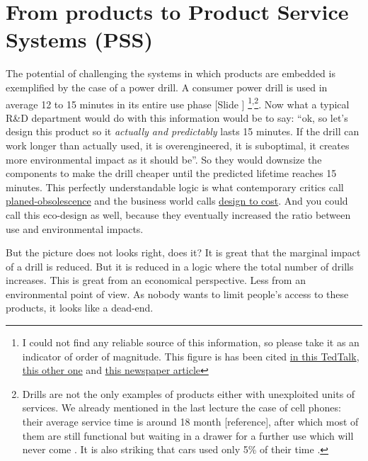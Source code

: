\documentclass{article}
\newcounter{slide}
\begin{document}
\section{From products to Product Service Systems (PSS)}
\label{sec:pss}
The potential of challenging the systems in which products are embedded is exemplified by the case of a power drill. A consumer power drill is used in average 12 to 15 minutes in its entire use phase {\color{blue}[Slide ]}
\footnote{I could not find any reliable source of this information, so please take it as an indicator of order of magnitude. This figure is has been cited \href{https://www.ted.com/talks/rachel_botsman_the_case_for_collaborative_consumption?language=en}{in this TedTalk}, \href{https://tedxinnovations.ted.com/2015/04/16/spotlight-tedx-talk-how-much-do-you-use-that-power-drill-why-were-sharing-tools-with-everyone-in-our-city/}{this other one} and \href{https://www.fastcompany.com/3050775/the-sharing-economy-is-dead-and-we-killed-it}{this newspaper article}}\textsuperscript{,}\footnote{Drills are not the only examples of products either with unexploited units of services. We already mentioned in the last lecture the case of cell phones: their average service time is around 18 month [reference], after which most of them are still functional but waiting in a drawer for a further use which will never come \cite{hanson2014s}. It is also striking that cars used only 5\% of their time \cite{meijkampChangingConsumerBehaviour1999}.}.
Now what a typical R\&D department would do with this information would be to say: ``ok, so let's design this product so it \emph{actually and predictably} lasts 15 minutes. If the drill can work longer than actually used, it is overengineered, it is suboptimal, it creates more environmental impact as it should be''. So they would downsize the components to make the drill cheaper until the predicted lifetime reaches 15 minutes. This perfectly understandable logic is what contemporary critics call \href{https://en.wikipedia.org/wiki/Planned_obsolescence}{planed-obsolescence} and the business world calls \href{https://en.wikipedia.org/wiki/Design-to-cost}{design to cost}. And you could call this eco-design as well, because they eventually increased the ratio between use and environmental impacts.

But the picture does not looks right, does it? It is great that the marginal impact of a drill is reduced. But it is reduced in a logic where the total number of drills increases. This is great from an economical perspective. Less from an environmental point of view. As nobody wants to limit people's access to these products, it looks like a dead-end.
\end{document}
